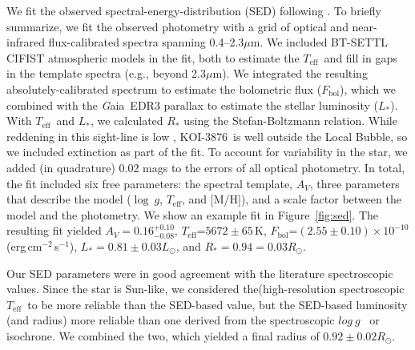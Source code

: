 \documentclass[twocolumn]{aastex631}
\newcommand{\starname}{KOI-3876}
\newcommand{\logg}{$log~g$ }
\newcommand{\um}{$\mu$m}
\newcommand{\fbol}{$F_{\mathrm{bol}}$}
\newcommand{\teff}{\ensuremath{T_{\text{eff}}}}
\newcommand{\gaia}{{\textit Gaia}}
\begin{document}
We fit the observed spectral-energy-distribution (SED) following \citet{Mann2016b}. To briefly summarize, we fit the observed photometry with a grid of optical and near-infrared flux-calibrated spectra spanning 0.4--2.3\um. We included BT-SETTL CIFIST atmospheric models \citep{BHAC15} in the fit, both to estimate the \teff\ and fill in gaps in the template spectra (e.g., beyond 2.3\um). We integrated the resulting absolutely-calibrated spectrum to estimate the bolometric flux (\fbol), which we combined with the \gaia\ EDR3 parallax to estimate the stellar luminosity ($L_*$). With \teff\ and $L_*$, we calculated $R_*$ using the Stefan-Boltzmann relation. While reddening in this sight-line is low \citep{2011ApJ...737..103S}, \starname\ is well outside the Local Bubble, so we included extinction as part of the fit. To account for variability in the star, we added (in quadrature) 0.02 mags to the errors of all optical photometry. In total, the fit included six free parameters: the spectral template, $A_V$, three parameters that describe the model ($\log~g$, \teff, and [M/H]), and a scale factor between the model and the photometry. We show an example fit in Figure~\ref{fig:sed}. The resulting fit yielded $A_V=0.16^{+0.10}_{-0.08}$, \teff=$5672\pm65$\,K, \fbol=$(2.55\pm0.10)\times10^{-10}$ (erg\,cm$^{-2}$\,s$^{-1}$), $L_*=0.81\pm0.03L_\odot$, and $R_*=0.94=0.03R_\odot$. 


Our SED parameters were in good agreement with the literature spectroscopic values. Since the star is Sun-like, we considered the(high-resolution spectroscopic \teff\ to be more reliable than the SED-based value, but the SED-based luminosity (and radius) more reliable than one derived from the spectroscopic \logg\ or isochrone. We combined the two, which yielded a final radius of $0.92\pm0.02R_\odot$.
\end{document}
